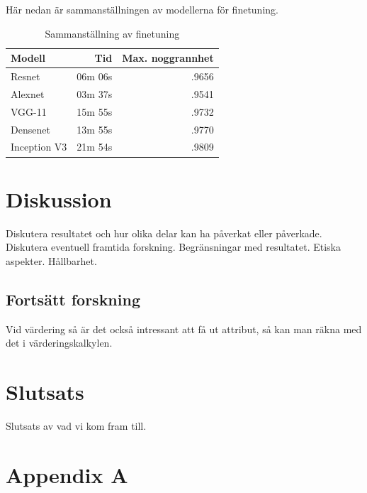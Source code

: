 \documentclass{kththesis}
\begin{document}
    Här nedan är sammanställningen av modellerna för finetuning.

    \begin{table}
      \centering
      \begin{tabular}{|l|r|r|}
        Modell & Tid & Max. noggrannhet \\ 
        \hline
        Resnet       & 06m 06s & .9656 \\
        Alexnet      & 03m 37s & .9541 \\
        VGG-11       & 15m 55s & .9732 \\
        Densenet     & 13m 55s & .9770 \\
        Inception V3 & 21m 54s & .9809 \\
      \end{tabular}
      \caption{Sammanställning av finetuning} \label{tab:sometab}
    \end{table}


\chapter{Diskussion}
Diskutera resultatet och hur olika delar kan ha påverkat eller påverkade. Diskutera eventuell framtida forskning. Begränsningar med resultatet.
Etiska aspekter. Hållbarhet. 

  \section{Fortsätt forskning}
  Vid värdering så är det också intressant att få ut attribut, så kan man räkna med det i värderingskalkylen.

\chapter{Slutsats}
Slutsats av vad vi kom fram till.

\printbibliography[heading=bibintoc]
\appendix
  \chapter{Appendix A}

\tailmatter
\end{document}
